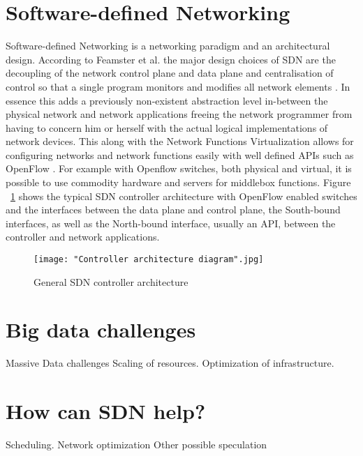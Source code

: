 \documentclass{acm_proc_article-sp}
\begin{document}
\section{Software-defined Networking}

Software-defined Networking is a networking paradigm and an architectural design. According to Feamster et al. the major design choices of SDN are the decoupling of the network control plane and data plane and centralisation of control so that a single program monitors and modifies all network elements \cite{Feamster:2013:RS:2559899.2560327}. In essence this adds a previously non-existent abstraction level in-between the physical network and network applications freeing the network programmer from having to concern him or herself with the actual logical implementations of network devices. This along with the Network Functions Virtualization allows for configuring networks and network functions easily with well defined APIs such as OpenFlow \cite{McKeown-CCR2008}. For example with Openflow switches, both physical and virtual, it is possible to use commodity hardware and servers for middlebox functions. Figure ~\ref{fig:architecture} shows the typical SDN controller architecture with OpenFlow enabled switches and the interfaces between the data plane and control plane, the South-bound interfaces, as well as the North-bound interface, usually an API, between the controller and network applications.
 

\begin{figure}[ht!]
\centering
{}
\texttt{[image: "Controller architecture diagram".jpg]}
\caption{General SDN controller architecture}
\label{fig:architecture}
\end{figure} 




\section{Big data challenges}

Massive Data challenges \cite{Frontiers} \cite{Azodolmolky}
Scaling of resources.
Optimization of infrastructure.

\section{How can SDN help?}

Scheduling. \cite{Scheduling}
Network optimization \cite{Wang:2012:PYN:2342441.2342462}
Other possible speculation
\end{document}
